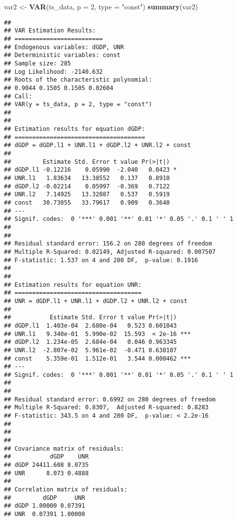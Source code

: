 \documentclass[
]{article}
\newenvironment{Shaded}{\begin{snugshade}}{\end{snugshade}}
\newcommand{\AttributeTok}[1]{\textcolor[rgb]{0.13,0.29,0.53}{#1}}
\newcommand{\DecValTok}[1]{\textcolor[rgb]{0.00,0.00,0.81}{#1}}
\newcommand{\FunctionTok}[1]{\textcolor[rgb]{0.13,0.29,0.53}{\textbf{#1}}}
\newcommand{\NormalTok}[1]{#1}
\newcommand{\OtherTok}[1]{\textcolor[rgb]{0.56,0.35,0.01}{#1}}
\newcommand{\StringTok}[1]{\textcolor[rgb]{0.31,0.60,0.02}{#1}}
\begin{document}
\begin{Shaded}
\begin{Highlighting}[]
\NormalTok{var2 }\OtherTok{\textless{}{-}} \FunctionTok{VAR}\NormalTok{(ts\_data, }\AttributeTok{p =} \DecValTok{2}\NormalTok{, }\AttributeTok{type =} \StringTok{"const"}\NormalTok{)}
\FunctionTok{summary}\NormalTok{(var2)}
\end{Highlighting}
\end{Shaded}

\begin{verbatim}
## 
## VAR Estimation Results:
## ========================= 
## Endogenous variables: dGDP, UNR 
## Deterministic variables: const 
## Sample size: 285 
## Log Likelihood: -2140.632 
## Roots of the characteristic polynomial:
## 0.9044 0.1505 0.1505 0.02604
## Call:
## VAR(y = ts_data, p = 2, type = "const")
## 
## 
## Estimation results for equation dGDP: 
## ===================================== 
## dGDP = dGDP.l1 + UNR.l1 + dGDP.l2 + UNR.l2 + const 
## 
##         Estimate Std. Error t value Pr(>|t|)  
## dGDP.l1 -0.12216    0.05990  -2.040   0.0423 *
## UNR.l1   1.83634   13.38552   0.137   0.8910  
## dGDP.l2 -0.02214    0.05997  -0.369   0.7122  
## UNR.l2   7.14925   13.32087   0.537   0.5919  
## const   30.73055   33.79617   0.909   0.3640  
## ---
## Signif. codes:  0 '***' 0.001 '**' 0.01 '*' 0.05 '.' 0.1 ' ' 1
## 
## 
## Residual standard error: 156.2 on 280 degrees of freedom
## Multiple R-Squared: 0.02149, Adjusted R-squared: 0.007507 
## F-statistic: 1.537 on 4 and 280 DF,  p-value: 0.1916 
## 
## 
## Estimation results for equation UNR: 
## ==================================== 
## UNR = dGDP.l1 + UNR.l1 + dGDP.l2 + UNR.l2 + const 
## 
##           Estimate Std. Error t value Pr(>|t|)    
## dGDP.l1  1.403e-04  2.680e-04   0.523 0.601043    
## UNR.l1   9.340e-01  5.990e-02  15.593  < 2e-16 ***
## dGDP.l2  1.234e-05  2.684e-04   0.046 0.963345    
## UNR.l2  -2.807e-02  5.961e-02  -0.471 0.638107    
## const    5.359e-01  1.512e-01   3.544 0.000462 ***
## ---
## Signif. codes:  0 '***' 0.001 '**' 0.01 '*' 0.05 '.' 0.1 ' ' 1
## 
## 
## Residual standard error: 0.6992 on 280 degrees of freedom
## Multiple R-Squared: 0.8307,  Adjusted R-squared: 0.8283 
## F-statistic: 343.5 on 4 and 280 DF,  p-value: < 2.2e-16 
## 
## 
## 
## Covariance matrix of residuals:
##           dGDP    UNR
## dGDP 24411.608 8.0735
## UNR      8.073 0.4888
## 
## Correlation matrix of residuals:
##         dGDP     UNR
## dGDP 1.00000 0.07391
## UNR  0.07391 1.00000
\end{verbatim}
\end{document}
